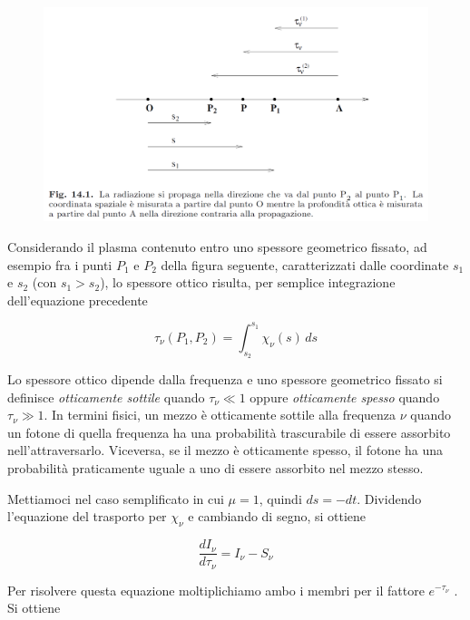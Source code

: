 \begin{figure}[H]
  \centering
  \includegraphics[width=14cm]{immagini/direzione_risoluzione_eq_trasporto_radiativo.png}
\end{figure}

Considerando il plasma contenuto entro uno spessore geometrico fissato, ad esempio fra i punti $P_1$ e $P_2$ della figura seguente, caratterizzati dalle coordinate $s_1$ e $s_2$ (con $s_1>s_2$), lo spessore ottico risulta, per semplice integrazione dell'equazione precedente

\begin{equation}
  \tau_{\nu}(P_1,P_2)=\int_{s_2}^{s_1} \chi_{\nu}(s) \, ds
\end{equation}

Lo spessore ottico dipende dalla frequenza e uno spessore geometrico fissato si definisce \textit{otticamente sottile} quando $\tau_{\nu} \ll 1$ oppure \textit{otticamente spesso} quando $\tau_{\nu} \gg 1$. In termini fisici, un mezzo è otticamente sottile alla frequenza $\nu$ quando un fotone di quella frequenza ha una probabilità trascurabile di essere assorbito nell'attraversarlo. Viceversa, se il mezzo è otticamente spesso, il fotone ha una probabilità praticamente uguale a uno di essere assorbito nel mezzo stesso.

\vspace{0.2cm}Mettiamoci nel caso semplificato in cui $\mu=1$, quindi $ds=-dt$. Dividendo l'equazione del trasporto per $\chi_{\nu}$ e cambiando di segno, si ottiene

\begin{equation}
  \frac{dI_{\nu}}{d \tau_{\nu}}=I_{\nu} - S_{\nu}
\end{equation}

Per risolvere questa equazione moltiplichiamo ambo i membri per il fattore $e^{-\tau_{\nu}}$ . Si ottiene

